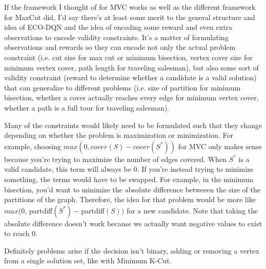 \documentclass{article}
\begin{document}
If the framework I thought of for MVC works as well as the different framework for MaxCut did, I'd say there's at least some merit to the general structure and idea of ECO-DQN and the idea of encoding some reward and even extra observations to encode validity constraints. It's a matter of formulating observations and rewards so they can encode not only the actual problem constraint (i.e. cut size for max cut or minimum bisection, vertex cover size for minimum vertex cover, path length for traveling salesman), but also some sort of validity constraint (reward to determine whether a candidate is a valid solution) that can generalize to different problems (i.e. size of partition for minimum bisection, whether a cover actually reaches every edge for minimum vertex cover, whether a path is a full tour for traveling salesman).

Many of the constraints would likely need to be formulated such that they change depending on whether the problem is maximization or minimization. For example, choosing $max(0, cover(S) - cover(S^*))$ for MVC only makes sense because you're trying to maximize the number of edges covered. When $S^*$ is a valid candidate, this term will always be 0. If you're instead trying to minimize something, the terms would have to be swapped. For example, in the minimum bisection, you'd want to minimize the absolute difference betweeen the size of the partitions of the graph. Therefore, the idea for that problem would be more like $max(0$, partdiff$(S^*) - $partdiff$(S))$ for a new candidate. Note that taking the absolute difference doesn't work because we actually want negative values to exist to reach 0.

Definitely problems arise if the decision isn't binary, adding or removing a vertex from a single solution set, like with Minimum K-Cut.



\end{document}
